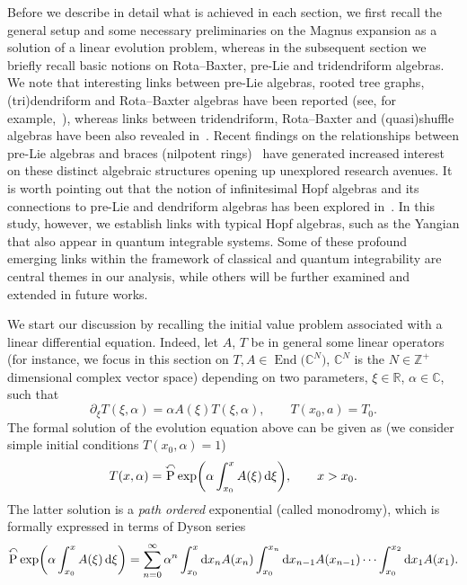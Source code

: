 \documentclass[10pt,a4paper]{amsart}
\numberwithin{equation}{section}
\newcounter{diff_order}
\newcounter{diff_power}
\theoremstyle{definition}
\DeclareMathOperator{\EEnd}{End}%
\def\mathcal#1{#1}%
\begin{document}
Before we describe in detail what is achieved in each section, we first recall the general setup and some necessary preliminaries on the Magnus expansion as a solution of a linear evolution problem, whereas in the subsequent section we briefly recall basic notions on Rota--Baxter, pre-Lie and tridendriform algebras.
We note that interesting links between pre-Lie algebras, rooted tree graphs, (tri)dendriform and Rota--Baxter algebras have been reported (see, for example,~\mbox{\cite{RBLoday, Ebra2, EbraMan, Dendri}}), whereas links between tridendriform, Rota--Baxter and (quasi)shuffle algebras have been also revealed in~\cite{LodaySh}. Recent findings on the relationships between pre-Lie algebras and braces (nilpotent rings)~\cite{Rump, Smok1, Smok2} have generated increased interest on these distinct algebraic structures opening up unexplored research avenues.
It is worth pointing out that the notion of infinitesimal Hopf algebras and its connections to pre-Lie and dendriform algebras has been explored in~\cite{Aguiar, Aguiar1}. In this study, however, we establish links with typical Hopf algebras, such as the Yangian that also appear in quantum integrable systems.
Some of these profound emerging links within the framework of classical and quantum integrability
{are central themes in our analysis}, while others will be further examined and extended in future works.

We start our discussion by recalling the
initial value problem associated with a linear differential equation. Indeed,
let $A$, $T$ be in general some linear operators (for instance, we focus in this section on $T, A \in \EEnd\bigl({\mathbb C}^{\mathcal N}\bigr)$, ${\mathbb C}^{\mathcal N}$ is the ${\mathcal N} \in {\mathbb Z}^+$ dimensional complex vector space) depending on two parameters, $\xi \in {\mathbb R}$, $\alpha \in {\mathbb C}$, such that
\begin{equation}
\partial_{\xi} T(\xi, \alpha) = \alpha A(\xi) T(\xi, \alpha), \qquad T(x_0,a) =T_0. \label{evo1}
\end{equation}
The formal solution of the evolution equation above can be given as
(we consider simple initial conditions $T(x_0, \alpha) =1$)
\begin{equation}
T(x, \alpha
) = \overset{\curvearrowleft} {\mathrm P} \exp \biggl(\alpha\int_{x_0}^{x}A(\xi) \,{\rm d} \xi\biggr), \qquad x>x_0. \label{eq:CTS_T}
\end{equation}
The latter solution is a {\it path ordered} exponential (called monodromy), which is formally
expressed in terms of Dyson series~\cite{Dyson}
\begin{gather}
\overset{\curvearrowleft} {\mathrm P} \exp\biggl( \alpha \int_{x_0}^{x} A(\xi) \,{\rm d} \xi \biggr)
=
\sum_{n=0}^{\infty}\alpha^n \int_{x_0}^x {\rm d}x_n A(x_n)
\int_{x_0}^{x_n }{\rm d}x_{n-1}A(x_{n-1}) \cdots \int_{x_0}^{x_2} {\rm d}x_{1} A(x_{1}). \label{12b}
\end{gather}
\end{document}
